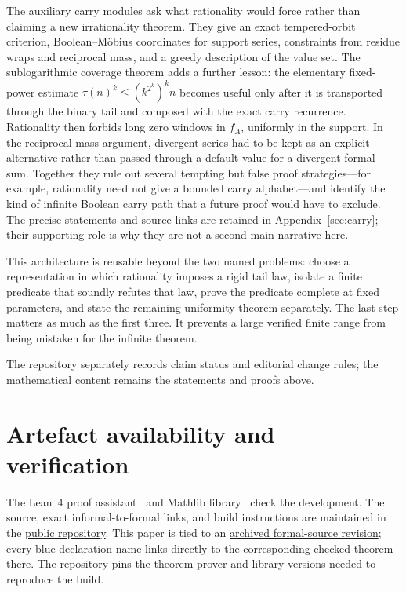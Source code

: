 \documentclass[11pt]{article}
\newcommand{\commit}{81150c1c6fdd4cd51e76d3aa0de344341e0e9e7c}
\newcommand{\sourceurl}{https://github.com/wcook04/plectis-lean-erdos249-257/tree/\commit}
\theoremstyle{definition}
\theoremstyle{remark}
\begin{document}
The auxiliary carry modules ask what rationality would force rather than
claiming a new irrationality theorem. They give an exact tempered-orbit
criterion, Boolean--M\"obius coordinates for support series, constraints from
residue wraps and reciprocal mass, and a greedy description of the value set.
The sublogarithmic coverage theorem adds a further lesson: the elementary
fixed-power estimate $\tau(n)^k\le(k^{2^k})^k n$ becomes useful only after it is
transported through the binary tail and composed with the exact carry
recurrence. Rationality then forbids long zero windows in $f_A$, uniformly in
the support. In the reciprocal-mass argument, divergent series had to be kept
as an explicit alternative rather than passed through a default value for a
divergent formal sum.
Together they rule out several tempting but false proof strategies---for
example, rationality need not give a bounded carry alphabet---and identify the
kind of infinite Boolean carry path that a future proof would have to exclude.
The precise statements and source links are retained in
Appendix~\ref{sec:carry}; their supporting role is why they are not a second
main narrative here.

This architecture is reusable beyond the two named problems: choose a
representation in which rationality imposes a rigid tail law, isolate a finite
predicate that soundly refutes that law, prove the predicate complete at fixed
parameters, and state the remaining uniformity theorem separately. The last
step matters as much as the first three. It prevents a large verified finite
range from being mistaken for the infinite theorem.

The repository separately records claim status and editorial change rules;
the mathematical content remains the statements and proofs above.

\section{Artefact availability and verification}\label{sec:verify}

The Lean~4 proof assistant~\cite{lean} and Mathlib library~\cite{mathlib} check
the development. The source, exact informal-to-formal links, and build
instructions are maintained in the
\href{https://github.com/wcook04/plectis-lean-erdos249-257}{public repository}.
This paper is tied to an
\href{\sourceurl}{archived formal-source revision}; every blue declaration name
links directly to the corresponding checked theorem there. The repository
pins the theorem prover and library versions needed to reproduce the build.
\end{document}
